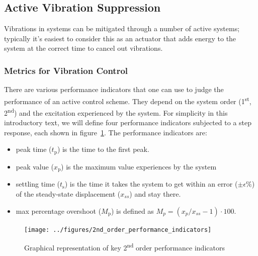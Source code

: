\documentclass[12pt,letter]{article}
\begin{document}
\pagebreak
\subsection{Active Vibration Suppression}

Vibrations in systems can be mitigated through a number of active systems; typically it's easiest to consider this as an actuator that adds energy to the system at the correct time to cancel out vibrations. 

\subsubsection{Metrics for Vibration Control}


There are various performance indicators that one can use to judge the performance of an active control scheme. They depend on the system order (1\textsuperscript{st}, 2\textsuperscript{nd}) and the excitation experienced by the system. For simplicity in this introductory text, we will define four performance indicators subjected to a step response, each shown in figure~\ref{fig:2nd_order_performance_indicators}. The performance indicators are:
\begin{itemize}[itemsep=0.25ex,topsep=0.25ex]
	\item peak time  ($t_\text{p}$) is the time to the first peak.
	\item peak value  ($x_\text{p}$) is the maximum value experiences by the system
	\item settling time ($t_\text{s}$) is the time it takes the system to get within an error ($\pm \epsilon \%$) of the steady-state displacement ($x_{ss}$) and stay there.
	\item max percentage overshoot ($M_\text{p}$) is defined as $M_p = ( {x_p} / {x_{ss}}-1 ) \cdot 100$.
\end{itemize}

\begin{figure}[H]
	\centering
	\texttt{[image: ../figures/2nd\_order\_performance\_indicators]}
	\caption{Graphical representation of key 2\textsuperscript{nd} order performance indicators}
	\label{fig:2nd_order_performance_indicators}
\end{figure}
\end{document}
